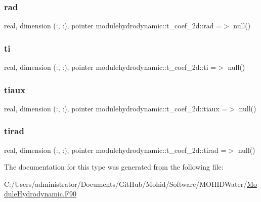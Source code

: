 \subsubsection{\texorpdfstring{rad}{rad}}
{\footnotesize\ttfamily real, dimension (\+:, \+:), pointer modulehydrodynamic\+::t\+\_\+coef\+\_\+2d\+::rad =$>$ null()\hspace{0.3cm}{\ttfamily [private]}}

\mbox{\label{structmodulehydrodynamic_1_1t__coef__2d_a15231849f5e2aa05bda6207204c8f32d}} 
\subsubsection{\texorpdfstring{ti}{ti}}
{\footnotesize\ttfamily real, dimension (\+:, \+:), pointer modulehydrodynamic\+::t\+\_\+coef\+\_\+2d\+::ti =$>$ null()\hspace{0.3cm}{\ttfamily [private]}}

\mbox{\label{structmodulehydrodynamic_1_1t__coef__2d_ad9e591fd00ea51bf95c9a900e702b4c0}} 
\subsubsection{\texorpdfstring{tiaux}{tiaux}}
{\footnotesize\ttfamily real, dimension (\+:, \+:), pointer modulehydrodynamic\+::t\+\_\+coef\+\_\+2d\+::tiaux =$>$ null()\hspace{0.3cm}{\ttfamily [private]}}

\mbox{\label{structmodulehydrodynamic_1_1t__coef__2d_ad67792b2d82d3724c33ebe41c4c2353a}} 
\subsubsection{\texorpdfstring{tirad}{tirad}}
{\footnotesize\ttfamily real, dimension (\+:, \+:), pointer modulehydrodynamic\+::t\+\_\+coef\+\_\+2d\+::tirad =$>$ null()\hspace{0.3cm}{\ttfamily [private]}}



The documentation for this type was generated from the following file\+:\begin{DoxyCompactItemize}
\item 
C\+:/\+Users/administrator/\+Documents/\+Git\+Hub/\+Mohid/\+Software/\+M\+O\+H\+I\+D\+Water/\mbox{\hyperlink{_module_hydrodynamic_8_f90}{Module\+Hydrodynamic.\+F90}}\end{DoxyCompactItemize}
